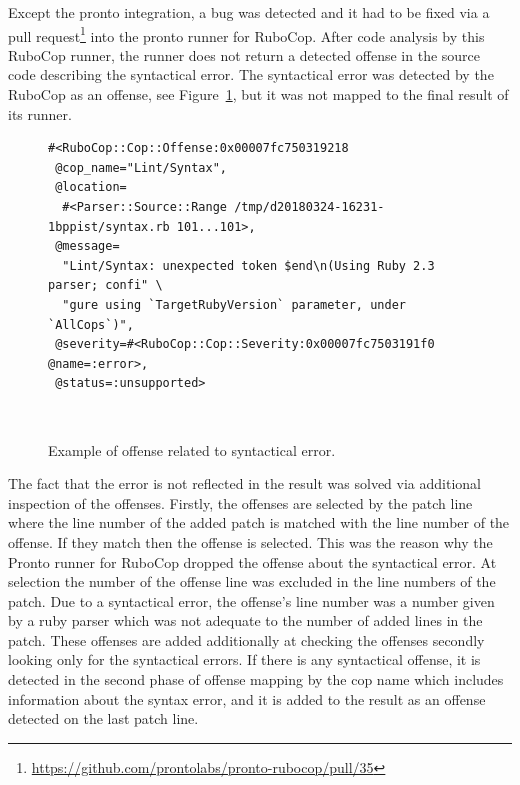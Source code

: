 Except the pronto integration, a bug was detected and it had to be fixed via a pull request\footnote{\url{https://github.com/prontolabs/pronto-rubocop/pull/35}} into the pronto runner for RuboCop. After code analysis by this RuboCop runner, the runner does not return a detected offense in the source code describing the syntactical error. The syntactical error was detected by the RuboCop as an offense, see Figure~\ref{fig:syntax_offense}, but it was not mapped to the final result of its runner.

\begin{figure}[H]
\begin{lstlisting}[basicstyle=\scriptsize, xleftmargin=.14\textwidth]
#<RuboCop::Cop::Offense:0x00007fc750319218
 @cop_name="Lint/Syntax",
 @location=
  #<Parser::Source::Range /tmp/d20180324-16231-1bppist/syntax.rb 101...101>,
 @message=
  "Lint/Syntax: unexpected token $end\n(Using Ruby 2.3 parser; confi" \
  "gure using `TargetRubyVersion` parameter, under `AllCops`)",
 @severity=#<RuboCop::Cop::Severity:0x00007fc7503191f0 @name=:error>,
 @status=:unsupported>
\end{lstlisting}  
\hfill\\[-3em]
\caption{Example of offense related to syntactical error.}
\label{fig:syntax_offense}
\end{figure}

The fact that the error is not reflected in the result was solved via additional inspection of the offenses. Firstly, the offenses are selected by the patch line where the line number of the added patch is matched with the line number of the offense. If they match then the offense is selected. This was the reason why the Pronto runner for RuboCop dropped the offense about the syntactical error. At selection the number of the offense line was excluded in the line numbers of the patch. Due to a syntactical error, the offense's line number was a number given by a ruby parser which was not adequate to the number of added lines in the patch. These offenses are added additionally at checking the offenses secondly looking only for the syntactical errors. If there is any syntactical offense, it is detected in the second phase of offense mapping by the cop name which includes information about the syntax error, and it is added to the result as an offense detected on the last patch line.

